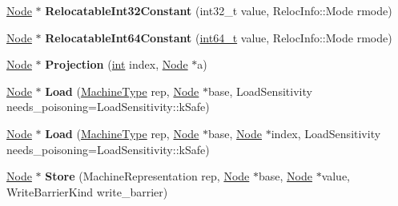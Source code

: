 \begin{DoxyCompactItemize}
\mbox{\hyperlink{classv8_1_1internal_1_1compiler_1_1Node}{Node}} $\ast$ {\bfseries Relocatable\+Int32\+Constant} (int32\+\_\+t value, Reloc\+Info\+::\+Mode rmode)
\item 
\mbox{\label{classv8_1_1internal_1_1compiler_1_1RawMachineAssembler_ab8316e6920fa58050c29bc904231b1a6}} 
\mbox{\hyperlink{classv8_1_1internal_1_1compiler_1_1Node}{Node}} $\ast$ {\bfseries Relocatable\+Int64\+Constant} (\mbox{\hyperlink{classint64__t}{int64\+\_\+t}} value, Reloc\+Info\+::\+Mode rmode)
\item 
\mbox{\label{classv8_1_1internal_1_1compiler_1_1RawMachineAssembler_aa75be831558c37aa5ea157e48412eae7}} 
\mbox{\hyperlink{classv8_1_1internal_1_1compiler_1_1Node}{Node}} $\ast$ {\bfseries Projection} (\mbox{\hyperlink{classint}{int}} index, \mbox{\hyperlink{classv8_1_1internal_1_1compiler_1_1Node}{Node}} $\ast$a)
\item 
\mbox{\label{classv8_1_1internal_1_1compiler_1_1RawMachineAssembler_a80a24d5984eb15271f638b024dad34c1}} 
\mbox{\hyperlink{classv8_1_1internal_1_1compiler_1_1Node}{Node}} $\ast$ {\bfseries Load} (\mbox{\hyperlink{classv8_1_1internal_1_1MachineType}{Machine\+Type}} rep, \mbox{\hyperlink{classv8_1_1internal_1_1compiler_1_1Node}{Node}} $\ast$base, Load\+Sensitivity needs\+\_\+poisoning=Load\+Sensitivity\+::k\+Safe)
\item 
\mbox{\label{classv8_1_1internal_1_1compiler_1_1RawMachineAssembler_a8d2d0bc61bf8ab9411055ed8f2d79890}} 
\mbox{\hyperlink{classv8_1_1internal_1_1compiler_1_1Node}{Node}} $\ast$ {\bfseries Load} (\mbox{\hyperlink{classv8_1_1internal_1_1MachineType}{Machine\+Type}} rep, \mbox{\hyperlink{classv8_1_1internal_1_1compiler_1_1Node}{Node}} $\ast$base, \mbox{\hyperlink{classv8_1_1internal_1_1compiler_1_1Node}{Node}} $\ast$index, Load\+Sensitivity needs\+\_\+poisoning=Load\+Sensitivity\+::k\+Safe)
\item 
\mbox{\label{classv8_1_1internal_1_1compiler_1_1RawMachineAssembler_a0372c812c2e2c4963011c2e6fc798a7a}} 
\mbox{\hyperlink{classv8_1_1internal_1_1compiler_1_1Node}{Node}} $\ast$ {\bfseries Store} (Machine\+Representation rep, \mbox{\hyperlink{classv8_1_1internal_1_1compiler_1_1Node}{Node}} $\ast$base, \mbox{\hyperlink{classv8_1_1internal_1_1compiler_1_1Node}{Node}} $\ast$value, Write\+Barrier\+Kind write\+\_\+barrier)

\end{DoxyCompactItemize}
